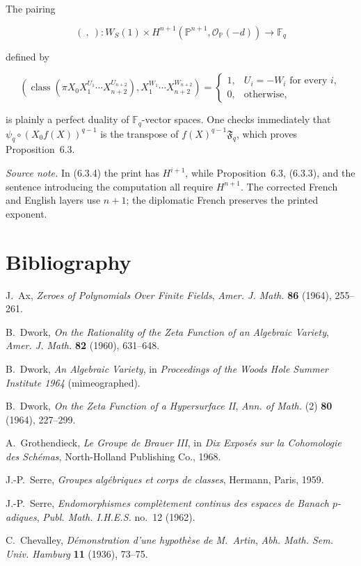 The pairing

\begin{equation}\tag{6.3.6}
(\ ,\ ):
W_S(1)\times
H^{n+1}(\mathbb P^{n+1},\mathcal O_{\mathbb P}(-d))
\longrightarrow\mathbb F_q
\end{equation}

defined by

\begin{equation}\tag{6.3.7}
\left(
\operatorname{class}\!\left(
\pi X_0X_1^{U_1}\cdots X_{n+2}^{U_{n+2}}
\right),
X_1^{W_1}\cdots X_{n+2}^{W_{n+2}}
\right)
=
\begin{cases}
1,&U_i=-W_i\text{ for every }i,\\
0,&\text{otherwise},
\end{cases}
\end{equation}

is plainly a perfect duality of $\mathbb F_q$-vector spaces.  One checks
immediately that
$\psi_q\circ(X_0f(X))^{q-1}$ is the transpose of
$f(X)^{q-1}\mathfrak F_q$, which proves Proposition~6.3.

\medskip
\noindent\emph{Source note.}
In (6.3.4) the print has $H^{i+1}$, while Proposition~6.3, (6.3.3), and the
sentence introducing the computation all require $H^{n+1}$.  The corrected
French and English layers use $n+1$; the diplomatic French preserves the
printed exponent.

\section*{Bibliography}

\begin{enumerate}[label={[\arabic*]},leftmargin=2.4em]
\item J.~Ax, \emph{Zeroes of Polynomials Over Finite Fields},
  \emph{Amer. J. Math.} \textbf{86} (1964), 255--261.
\item B.~Dwork, \emph{On the Rationality of the Zeta Function of an Algebraic
  Variety}, \emph{Amer. J. Math.} \textbf{82} (1960), 631--648.
\item B.~Dwork, \emph{An Algebraic Variety}, in \emph{Proceedings of the
  Woods Hole Summer Institute 1964} (mimeographed).
\item B.~Dwork, \emph{On the Zeta Function of a Hypersurface II},
  \emph{Ann. of Math.} (2) \textbf{80} (1964), 227--299.
\item A.~Grothendieck, \emph{Le Groupe de Brauer III}, in
  \emph{Dix Exposés sur la Cohomologie des Schémas},
  North-Holland Publishing Co., 1968.
\item J.-P.~Serre, \emph{Groupes algébriques et corps de classes},
  Hermann, Paris, 1959.
\item J.-P.~Serre, \emph{Endomorphismes complètement continus des espaces de
  Banach $p$-adiques}, \emph{Publ. Math. I.H.E.S.} no.~12 (1962).
\item C.~Chevalley, \emph{Démonstration d'une hypothèse de M.~Artin},
  \emph{Abh. Math. Sem. Univ. Hamburg} \textbf{11} (1936), 73--75.
\end{enumerate}
